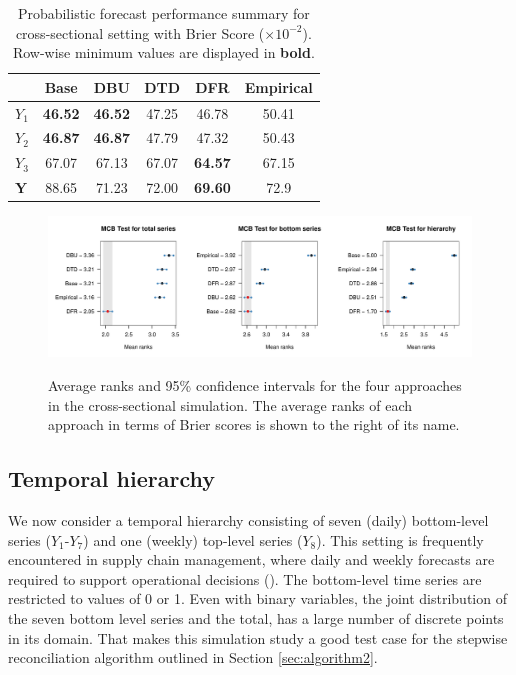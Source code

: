 \documentclass[a4paper,review,12pt,authoryear]{elsarticle}
\theoremstyle{definition}
\begin{document}
    \begin{table}
      \centering
      \caption{\label{tab:sim_crosssectional_res_dist} Probabilistic forecast performance summary for cross-sectional setting with Brier Score ($\times 10^{-2}$). Row-wise minimum values are displayed in \textbf{bold}.}
      \begin{tabular}{lccccc}
      \toprule
      ~ & Base & DBU & DTD & DFR & Empirical \\ \midrule
      $Y_1$ & \textbf{46.52} & \textbf{46.52} & 47.25 & 46.78 & 50.41 \\ 
      $Y_2$ & \textbf{46.87} & \textbf{46.87} & 47.79 & 47.32 & 50.43 \\ 
      $Y_3$ & 67.07 & 67.13 & 67.07 & \textbf{64.57} & 67.15 \\ 
      $\mathbf{Y}$ & 88.65 & 71.23 & 72.00 & \textbf{69.60} & 72.9 \\ 
      \bottomrule
      \end{tabular}
    \end{table}

    \begin{figure}
	\centering
	\caption{Average ranks and 95\% confidence intervals for the four approaches in the cross-sectional simulation. The average ranks of each approach in terms of Brier scores is shown to the right of its name.}
	\includegraphics[width=\textwidth]{figures/sim_cross_mcb.pdf}
    \label{fig:mcb_crosssectional} 
    \end{figure}


     \subsection{Temporal hierarchy}\label{sec:temporal_simu}
     We now consider a temporal hierarchy consisting of seven (daily) bottom-level series ($Y_1$-$Y_7$) and one (weekly) top-level series ($Y_8$).
     This setting is frequently encountered in supply chain management, where daily and weekly forecasts are required to support operational decisions (\citealp{syntetosSupplyChainForecasting2016}).
     The bottom-level time series are restricted to values of 0 or 1.
     Even with binary variables, the joint distribution of the seven bottom level series and the total, has a large number of discrete points in its domain. That makes this simulation study a good test case for the stepwise reconciliation algorithm outlined in Section \ref{sec:algorithm2}.
\end{document}
